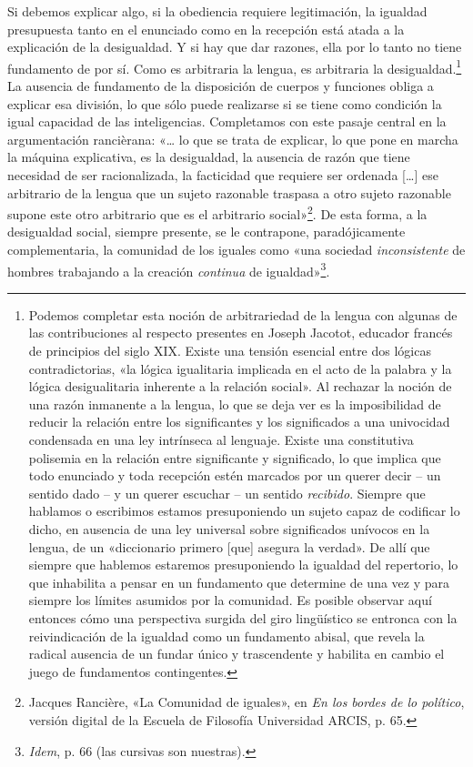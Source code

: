 Si debemos explicar algo, si la obediencia requiere legitimación, la igualdad presupuesta tanto en el enunciado como en la recepción está atada a la explicación de la desigualdad. Y si hay que dar razones, ella por lo tanto no tiene fundamento de por sí. Como es arbitraria la lengua, es arbitraria la desigualdad.\footnote{Podemos completar esta noción de arbitrariedad de la lengua con algunas de las contribuciones al respecto presentes en Joseph Jacotot, educador francés de principios del siglo XIX. Existe una tensión esencial entre dos lógicas contradictorias, «la lógica igualitaria implicada en el acto de la palabra y la lógica desigualitaria inherente a la relación social». Al rechazar la noción de una razón inmanente a la lengua, lo que se deja ver es la imposibilidad de reducir la relación entre los significantes y los significados a una univocidad condensada en una ley intrínseca al lenguaje. Existe una constitutiva polisemia en la relación entre significante y significado, lo que implica que todo enunciado y toda recepción estén marcados por un querer decir -- un sentido dado -- y un querer escuchar -- un sentido \emph{recibido}. Siempre que hablamos o escribimos estamos presuponiendo un sujeto capaz de codificar lo dicho, en ausencia de una ley universal sobre significados unívocos en la lengua, de un «diccionario primero {[}que{]} asegura la verdad». De allí que siempre que hablemos estaremos presuponiendo la igualdad del repertorio, lo que inhabilita a pensar en un fundamento que determine de una vez y para siempre los límites asumidos por la comunidad. Es posible observar aquí entonces cómo una perspectiva surgida del giro lingüístico se entronca con la reivindicación de la igualdad como un fundamento abisal, que revela la radical ausencia de un fundar único y trascendente y habilita en cambio el juego de fundamentos contingentes.} La ausencia de fundamento de la disposición de cuerpos y funciones obliga a explicar esa división, lo que sólo puede realizarse si se tiene como condición la igual capacidad de las inteligencias. Completamos con este pasaje central en la argumentación rancièrana: «\ldots{} lo que se trata de explicar, lo que pone en marcha la máquina explicativa, es la desigualdad, la ausencia de razón que tiene necesidad de ser racionalizada, la facticidad que requiere ser ordenada {[}\ldots{]} ese arbitrario de la lengua que un sujeto razonable traspasa a otro sujeto razonable supone este otro arbitrario que es el arbitrario social»\footnote{Jacques Rancière, «La Comunidad de iguales», en \emph{En los bordes de lo político}, versión digital de la Escuela de Filosofía Universidad ARCIS, p. 65.}. De esta forma, a la desigualdad social, siempre presente, se le contrapone, paradójicamente complementaria, la comunidad de los iguales como «una sociedad \emph{inconsistente} de hombres trabajando a la creación \emph{continua} de igualdad»\footnote{\emph{Idem}, p. 66 (las cursivas son nuestras).}.


